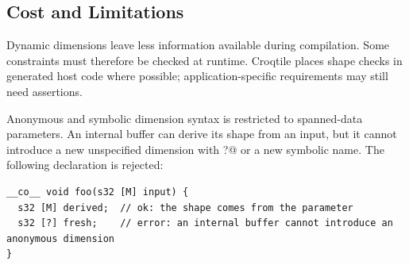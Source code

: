 \subsection*{Cost and Limitations}

Dynamic dimensions leave less information available during compilation. Some constraints must therefore be checked at runtime. Croqtile places shape checks in generated host code where possible; application-specific requirements may still need assertions.

Anonymous and symbolic dimension syntax is restricted to spanned-data parameters. An internal buffer can derive its shape from an input, but it cannot introduce a new unspecified dimension with \co@?@ or a new symbolic name. The following declaration is rejected:

\begin{lstlisting}[language=croqtile,caption={Cost and Limitations}]
__co__ void foo(s32 [M] input) {
  s32 [M] derived;  // ok: the shape comes from the parameter
  s32 [?] fresh;    // error: an internal buffer cannot introduce an anonymous dimension
}
\end{lstlisting}
